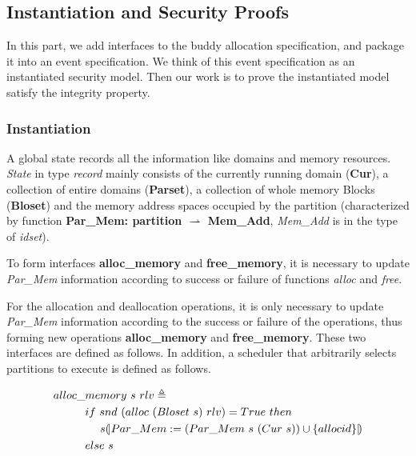 \subsection{Instantiation and Security Proofs}\label{sec:securityproof}
In this part, we add interfaces to the buddy allocation specification, and package it into an event specification. We think of this event specification as an instantiated security model. Then our work is to prove the instantiated model satisfy the integrity property.

\subsubsection{Instantiation}
A global state records all the information like domains and memory resources. \emph{State} in type \emph{record} mainly consists of the currently running domain (\textbf{Cur}), a collection of entire domains (\textbf{Parset}), a collection of whole memory Blocks (\textbf{Bloset}) and the memory address spaces occupied by the partition (characterized by function \textbf{Par\_Mem: partition $\rightharpoonup$ Mem\_Add}, \emph{Mem\_Add} is in the type of \emph{idset}).

To form interfaces \textbf{alloc\_memory} and \textbf{free\_memory}, it is necessary to update \emph{Par\_Mem} information according to success or failure of functions \emph{alloc} and \emph{free}. 

For the allocation and deallocation operations, it is only necessary to update \emph{Par\_Mem} information according to the success or failure of the operations, thus forming new operations \textbf{alloc\_memory} and \textbf{free\_memory}. These two interfaces are defined as follows. In addition, a scheduler that arbitrarily selects partitions to execute is defined as follows.

\begin{definition} 
\vspace{-7pt}
\end{definition}
{\footnotesize
\begin{align*}
alloc\_&memory\ s\ rlv \triangleq \\
&if\ snd\ (alloc\ (Bloset\ s)\ rlv) = True\ then \\
&\ \ \ \ s{\emph{$\mathopen{(\mkern-3mu\mid}$}} Par\_Mem := (Par\_Mem\ s\ (Cur\ s)) \cup \lbrace allocid \rbrace {\emph{$\mathclose{\mid\mkern-3mu)}$}} \\
&else\ s
\end{align*}
}
\vspace{-12pt}

